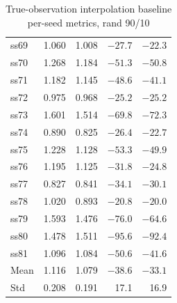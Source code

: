 \begin{table}[htbp]
{\begin{tabular}{lrrrr}
ss69 & 1.060 & 1.008 & $-27.7$ & $-22.3$ \\
ss70 & 1.268 & 1.184 & $-51.3$ & $-50.8$ \\
ss71 & 1.182 & 1.145 & $-48.6$ & $-41.1$ \\
ss72 & 0.975 & 0.968 & $-25.2$ & $-25.2$ \\
ss73 & 1.601 & 1.514 & $-69.8$ & $-72.3$ \\
ss74 & 0.890 & 0.825 & $-26.4$ & $-22.7$ \\
ss75 & 1.228 & 1.128 & $-53.3$ & $-49.9$ \\
ss76 & 1.195 & 1.125 & $-31.8$ & $-24.8$ \\
ss77 & 0.827 & 0.841 & $-34.1$ & $-30.1$ \\
ss78 & 1.020 & 0.893 & $-20.8$ & $-20.0$ \\
ss79 & 1.593 & 1.476 & $-76.0$ & $-64.6$ \\
ss80 & 1.478 & 1.511 & $-95.6$ & $-92.4$ \\
ss81 & 1.096 & 1.084 & $-50.6$ & $-41.6$ \\
\midrule
Mean & 1.116 & 1.079 & $-38.6$ & $-33.1$ \\
Std  & 0.208 & 0.191 & 17.1    & 16.9    \\
\bottomrule
\end{tabular}}
\caption{True-observation interpolation baseline per-seed metrics, rand 90/10}
\label{tab:per_seed_trueobs}
\end{table}

